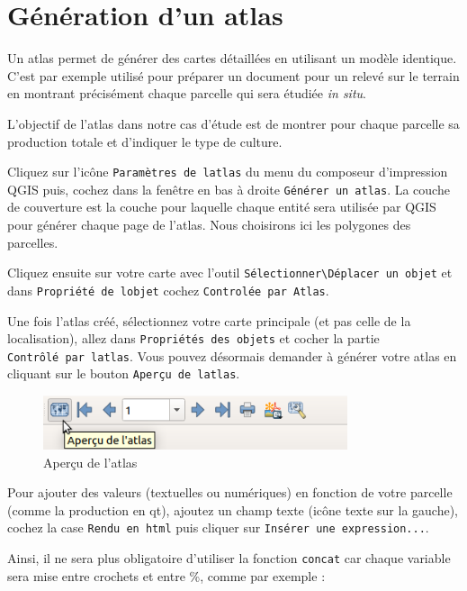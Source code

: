 \section{Génération d'un atlas}\label{guxe9nuxe9ration-dun-atlas}

Un atlas permet de générer des cartes détaillées en utilisant un modèle
identique. C'est par exemple utilisé pour préparer un document pour un
relevé sur le terrain en montrant précisément chaque parcelle qui sera
étudiée \emph{in situ}.

L'objectif de l'atlas dans notre cas d'étude est de montrer pour chaque
parcelle sa production totale et d'indiquer le type de culture.

Cliquez sur l'icône \texttt{Paramètres\ de\ l\textquotesingle{}atlas} du
menu du composeur d'impression QGIS puis, cochez dans la fenêtre en bas
à droite \texttt{Générer\ un\ atlas}. La couche de couverture est la
couche pour laquelle chaque entité sera utilisée par QGIS pour générer
chaque page de l'atlas. Nous choisirons ici les polygones des parcelles.

Cliquez ensuite sur votre carte avec l'outil
\texttt{Sélectionner\textbackslash{}Déplacer\ un\ objet} et dans
\texttt{Propriété\ de\ l\textquotesingle{}objet} cochez
\texttt{Controlée\ par\ Atlas}.

Une fois l'atlas créé, sélectionnez votre carte principale (et pas celle
de la localisation), allez dans \texttt{Propriétés\ des\ objets} et
cocher la partie \texttt{Contrôlé\ par\ l\textquotesingle{}atlas}. Vous
pouvez désormais demander à générer votre atlas en cliquant sur le
bouton \texttt{Aperçu\ de\ l\textquotesingle{}atlas}.

\begin{figure}[htbp]
\centering
\includegraphics[height=0.62500in]{figures/generate_atlas.png}
\caption{Aperçu de l'atlas}
\end{figure}

Pour ajouter des valeurs (textuelles ou numériques) en fonction de votre
parcelle (comme la production en qt), ajoutez un champ texte (icône
texte sur la gauche), cochez la case \texttt{Rendu\ en\ html} puis
cliquer sur \texttt{Insérer\ une\ expression...}.

Ainsi, il ne sera plus obligatoire d'utiliser la fonction
\texttt{concat} car chaque variable sera mise entre crochets et entre
\%, comme par exemple :

